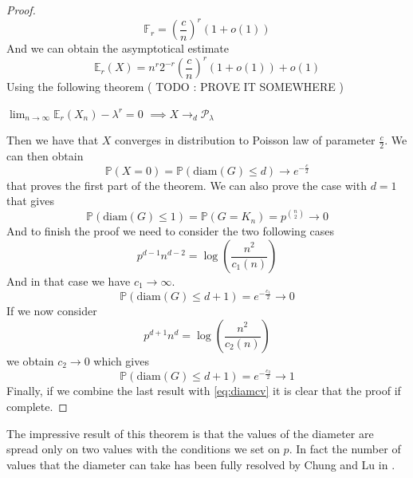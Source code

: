 \begin{proof}
	
	\begin{equation}
		\mathbb{F}_r = (\frac{c}{n})^r(1+o(1))
	\end{equation}
	And we can obtain the asymptotical estimate
	\begin{equation}
		\mathbb{E}_r(X) = n^r2^{-r}(\frac{c}{n})^r(1+o(1)) + o(1)
	\end{equation}
	Using the following theorem ( TODO : PROVE IT SOMEWHERE )
	\begin{theorem}
		$\lim_{n\to\infty} \mathbb{E}_r(X_n) - \lambda^r = 0$
			\newline
			$\implies X \longrightarrow_d \mathcal{P}_{\lambda}$
	\end{theorem}
	Then we have that $X$ converges in distribution to Poisson law of parameter $\frac{c}{2}$.
	\newline
	We can then obtain 
	\begin{equation}\label{eq:diamcv}
		\mathbb{P}(X=0) = \mathbb{P}(\text{diam}(G) \leq d) \longrightarrow e^{-\frac{c}{2}}
	\end{equation}
	that proves the first part of the theorem. We can also prove the case with $d=1$ that gives
	\begin{equation}
		\mathbb{P}(\text{diam}(G) \leq 1) = \mathbb{P}(G = K_n) = p^{\binom{n}{2}} \longrightarrow 0
	\end{equation}
	And to finish the proof we need to consider the two following cases
	\begin{equation}
		p^{d-1}n^{d-2} = \log(\frac{n^2}{c_1(n)})
	\end{equation}
	And in that case we have $c_1 \longrightarrow \infty$.
	\begin{equation}
		\mathbb{P}(\text{diam}(G) \leq d+1) = e^{-\frac{c_1}{2}} \longrightarrow 0
	\end{equation}
	If we now consider
	\begin{equation}
		p^{d+1}n^d = \log(\frac{n^2}{c_2(n)})
	\end{equation}
	we obtain $c_2 \longrightarrow 0$ which gives
	\begin{equation}
		\mathbb{P}(\text{diam}(G) \leq d+1) = e^{-\frac{c_2}{2}} \longrightarrow 1
	\end{equation}
	Finally, if we combine the last result with \ref{eq:diamcv} it is clear that the proof if complete.
\end{proof}
The impressive result of this theorem is that the values of the diameter are spread only on two values with the conditions we set on $p$. In fact the number of values that the diameter can take has been fully resolved by Chung and Lu in \cite{ChungLu01}.
